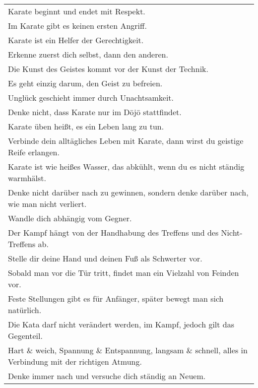 \begin{tcolorbox}[width=\textwidth,height=\textheight,right=12pt,left=12pt,colframe=lightgray,colback=white,fonttitle=\bfseries,coltitle=black,title=Allgemeines:\indent D\={o}j\={o}kun nach Funakoshi Gichin \textmd{{\footnotesize \textit{auch Sh\={o}t\={o}  Nij\={u} Kun}}}]
	\null\vfill\null	
	\begin{tabularx}{\textwidth}{X}
		Karate beginnt und endet mit Respekt. \\
		Im Karate gibt es keinen ersten Angriff. \\ 
		Karate ist ein Helfer der Gerechtigkeit. \\
		Erkenne zuerst dich selbst, dann den anderen. \\
		Die Kunst des Geistes kommt vor der Kunst der Technik. \\
		Es geht einzig darum, den Geist zu befreien. \\
		Unglück geschieht immer durch Unachtsamkeit. \\
		Denke nicht, dass Karate nur im D\={o}j\={o} stattfindet. \\
		Karate üben heißt, es ein Leben lang zu tun. \\
		Verbinde dein alltägliches Leben mit Karate, dann wirst du geistige
		Reife erlangen. \\
		Karate ist wie heißes Wasser, das abkühlt, wenn du es nicht ständig
		warmhälst. \\
		Denke nicht darüber nach zu gewinnen, sondern denke darüber nach, wie
		man nicht verliert. \\
		Wandle dich abhängig vom Gegner. \\
		Der Kampf hängt von der Handhabung des Treffens und des Nicht-Treffens
		ab. \\
		Stelle dir deine Hand und deinen Fuß als Schwerter vor. \\
		Sobald man vor die Tür tritt, findet man ein Vielzahl von Feinden vor. \\
		Feste Stellungen gibt es für Anfänger, später bewegt man sich natürlich. \\
		Die Kata darf nicht verändert werden, im Kampf, jedoch gilt das Gegenteil. \\
		Hart \& weich, Spannung \&  Entspannung, langsam \& schnell, alles in
		Verbindung mit der richtigen Atmung. \\
		Denke immer nach und versuche dich ständig an Neuem. \\
	\end{tabularx}\\\null\vfill\null
\end{tcolorbox}
\clearpage
\pagebreak
